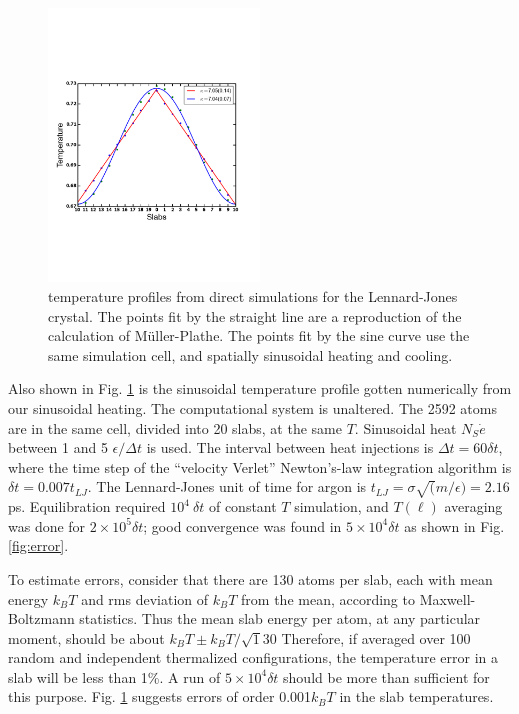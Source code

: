 \documentclass[aps,prb,twocolumn,showpacs,superscriptaddress]{revtex4-1}\begin{tiny}\end{tiny}
\begin{document}
\par
\begin{figure}[top]
\includegraphics[angle=0,width=0.5\textwidth]{amplitude6.pdf}%
\caption{\label{fig:amplitude} temperature profiles from direct simulations for the 
Lennard-Jones crystal.  The points fit by the straight line are a reproduction of the
calculation of M\"uller-Plathe.  The points fit by the sine curve use the same simulation
cell, and spatially sinusoidal heating and cooling.}
\end{figure}
\par

Also shown in Fig. \ref{fig:amplitude} is the sinusoidal temperature profile gotten
numerically from our sinusoidal heating.  The computational system is unaltered.  The  
2592 atoms are in the same cell, divided into 20 slabs, at the same $T$.    Sinusoidal heat 
$N_S \dot{e}$ between 1 and 5 $\epsilon/\Delta t$ is used.  
The interval between heat injections is $\Delta t= 60\delta t$,
where the time step of the ``velocity Verlet''  Newton's-law 
integration algorithm \cite{Hansen,Verlet} is $\delta t = 0.007 t_{LJ}$.  The
Lennard-Jones unit of time for argon is $t_{LJ}=\sigma\sqrt(m/\epsilon)=2.16$ ps.
Equilibration required $10^4 \ \delta t$ of constant $T$ simulation, and $T(\ell)$ averaging was done
for $2\times10^5 \delta t$; good convergence was found in $5\times10^4 \delta t$ as shown in Fig.
\ref{fig:error}.

To estimate errors, consider that there are 130 atoms per slab, each with mean energy $k_B T$
and rms deviation of $k_B T$ from the mean, according to Maxwell-Boltzmann statistics.  
Thus the mean slab energy per atom, at any particular moment,
should be about $k_B T \pm k_B T/\sqrt 130$  Therefore, if averaged over 100 random and independent
thermalized configurations, the temperature error in a slab will be less than 1\%.  A run of
$5\times10^4 \delta t$ should be more than sufficient for this purpose.  Fig. \ref{fig:amplitude}
suggests errors of order 0.001$k_B T$ in the slab temperatures.
\end{document}
